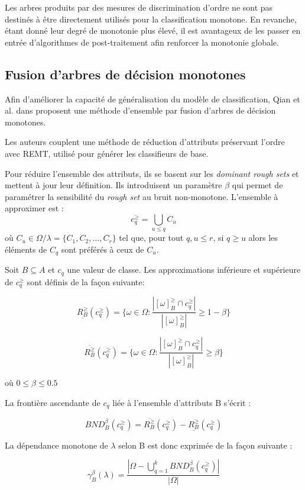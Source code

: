 \documentclass[a4paper]{article}
\begin{document}
Les arbres produits par des mesures de discrimination d'ordre ne sont pas
destinés à être directement utilisés pour la classification monotone. En
revanche, étant donné leur degré de monotonie plus élevé, il est avantageux de
les passer en entrée d'algorithmes de post-traitement afin renforcer la
monotonie globale.

\subsection{Fusion d'arbres de décision monotones} Afin d'améliorer la capacité
de généralisation du modèle de classification, Qian et al. dans
\cite{qian-fusing} proposent une méthode d'ensemble par fusion d'arbres de décision
monotones.

Les auteurs couplent une méthode de réduction d'attributs préservant l'ordre
avec REMT, utilisé pour générer les classifieurs de base.

Pour réduire l'ensemble des attributs, ils se basent sur les \textit{dominant
rough sets} et mettent à jour leur définition. Ils introduisent un paramètre
$\beta$ qui permet de paramétrer la sensibilité du \textit{rough set} au bruit
non-monotone. L'ensemble à approximer est : 
$$c^{\geq}_q = \bigcup_{u \leq q} C_u$$
où $C_u \in \Omega / \lambda = \{C_1, C_2,...,C_r\}$ tel que, pour tout $q, u \leq r$, si $q
\geq u$ alors les éléments de $C_q$ sont préférés à ceux de $C_u$.

\noindent Soit $B \subseteq A$ et $c_q$ une valeur de classe. Les approximations
inférieure et supérieure de $c^{\geq}_q$ sont définis de la façon suivante:

$$ \underline{R^{\geq}_B}(c^{\geq}_q) = \{\omega \in \Omega :
\frac{|[\omega]^{\geq}_B \cap c^{\geq}_q|}{|[\omega]^{\geq}_B|} \geq 1 -
\beta\}$$

$$ \overline{R^{\geq}_B}(c^{\geq}_q) = \{\omega \in \Omega :
\frac{|[\omega]^{\geq}_B \cap c^{\geq}_q|}{|[\omega]^{\geq}_B|} \geq \beta\}$$

\noindent où $0 \leq \beta \leq 0.5$

\noindent La frontière ascendante de $c_q$ liée à l'ensemble d'attributs B s'écrit :

$$ BND^{\beta}_B(c^{\geq}_q) = \overline{R^{\geq}_B}(c^{\geq}_q) - \underline{R^{\geq}_B}(c^{\geq}_q)$$

\noindent La dépendance monotone de $\lambda$ selon B est donc exprimée de la façon
suivante :

$$ \gamma^{\beta}_B(\lambda) = \frac{|\Omega - \bigcup_{q=1}^k
BND^{\beta}_B(c^{\geq}_q)|}{|\Omega|}$$
\end{document}
